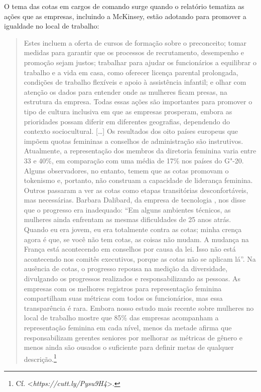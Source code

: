 O tema das cotas em cargos de comando surge quando o relatório tematiza
as ações que as empresas, incluindo a McKinsey, estão adotando para
promover a igualdade no local de trabalho:

\begin{quote}
Estes incluem a oferta de cursos de formação sobre o preconceito; tomar
medidas para garantir que os processos de recrutamento, desempenho e
promoção sejam justos; trabalhar para ajudar os funcionários a
equilibrar o trabalho e a vida em casa, como oferecer licença parental
prolongada, condições de trabalho flexíveis e apoio à assistência
infantil; e olhar com atenção os dados para entender onde as mulheres
ficam presas, na estrutura da empresa. Todas essas ações são importantes
para promover o tipo de cultura inclusiva em que as empresas prosperam,
embora as prioridades possam diferir em diferentes geografias,
dependendo do contexto sociocultural. {[}\ldots{}{]} Os resultados dos oito
países europeus que impõem quotas femininas a conselhos de administração
são instrutivos. Atualmente, a representação dos membros da diretoria
feminina varia entre 33 e 40\%, em comparação com uma média de 17\% nos
países do G"-20. Alguns observadores, no entanto, temem que as cotas
promovam o tokenismo e, portanto, não construam a capacidade de
liderança feminina. Outros passaram a ver as cotas como etapas
transitórias desconfortáveis, mas necessárias. Barbara Dalibard,  da
empresa de tecnologia , nos disse que o progresso era inadequado:
``Em alguns ambientes técnicos, as mulheres ainda enfrentam as mesmas
dificuldades de 25 anos atrás. Quando eu era jovem, eu era totalmente
contra as cotas; minha crença agora é que, se você não tem cotas, as
coisas não mudam. A mudança na França está acontecendo em conselhos por
causa da lei. Isso não está acontecendo nos comitês executivos, porque
as cotas não se aplicam lá''. Na ausência de cotas, o progresso repousa
na medição da diversidade, divulgando os progressos realizados e
responsabilizando as pessoas. As empresas com os melhores registros para
representação feminina compartilham suas métricas com todos os
funcionários, mas essa transparência é rara. Embora nosso estudo mais
recente sobre mulheres no local de trabalho mostre que 85\% das empresas
acompanham a representação feminina em cada nível, menos da metade
afirma que responsabilizam gerentes seniores por melhorar as métricas de
gênero e menos ainda são ousados ​​o suficiente para definir metas de
qualquer descrição.\footnote{Cf.
  \textless{}\emph{https://cutt.ly/Pysu9H4}\textgreater{}.}
\end{quote}

